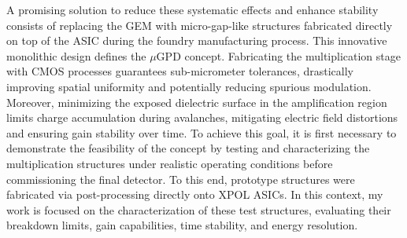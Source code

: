 \documentclass[12pt, a4paper]{article}
\begin{document}
A promising solution to reduce these systematic effects and enhance stability consists of replacing the GEM with micro-gap-like structures fabricated directly on top of the ASIC during the foundry manufacturing process. This innovative monolithic design defines the $\mu$GPD concept. Fabricating the multiplication stage with CMOS processes guarantees sub-micrometer tolerances, drastically improving spatial uniformity and potentially reducing spurious modulation. Moreover, minimizing the exposed dielectric surface in the amplification region limits charge accumulation during avalanches, mitigating electric field distortions and ensuring gain stability over time. To achieve this goal, it is first necessary to demonstrate the feasibility of the concept by testing and characterizing the multiplication structures under realistic operating conditions before commissioning the final detector. To this end, prototype structures were fabricated via post-processing directly onto XPOL ASICs. In this context, my work is focused on the characterization of these test structures, evaluating their breakdown limits, gain capabilities, time stability, and energy resolution.



\end{document}

